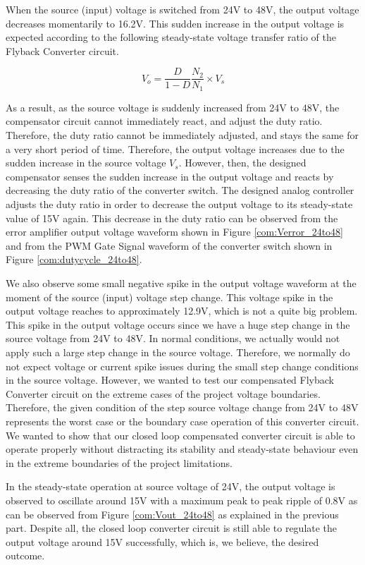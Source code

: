 When the source (input) voltage is switched from 24V to 48V, the output voltage decreases momentarily to 16.2V. This sudden increase in the output voltage is expected according to the following steady-state voltage transfer ratio of the Flyback Converter circuit.

$$ V_o = \frac{D}{1-D}\frac{N_2}{N_1}\times V_s $$

As a result, as the source voltage is suddenly increased from 24V to 48V, the compensator circuit cannot immediately react, and adjust the duty ratio. Therefore, the duty ratio cannot be immediately adjusted, and stays the same for a very short period of time. Therefore, the output voltage increases due to the sudden increase in the source voltage $V_s$. However, then, the designed compensator senses the sudden increase in the output voltage and reacts by decreasing the duty ratio of the converter switch. The designed analog controller adjusts the duty ratio in order to decrease the output voltage to its steady-state value of 15V again. This decrease in the duty ratio can be observed from the error amplifier output voltage waveform shown in Figure \ref{com:Verror_24to48} and from the PWM Gate Signal waveform of the converter switch shown in Figure \ref{com:dutycycle_24to48}.

We also observe some small negative spike in the output voltage waveform at the moment of the source (input) voltage step change. This voltage spike in the output voltage reaches to approximately 12.9V, which is not a quite big problem. This spike in the output voltage occurs since we have a huge step change in the source voltage from 24V to 48V. In normal conditions, we actually would not apply such a large step change in the source voltage. Therefore, we normally do not expect voltage or current spike issues during the small step change conditions in the source voltage. However, we wanted to test our compensated Flyback Converter circuit on the extreme cases of the project voltage boundaries. Therefore, the given condition of the step source voltage change from 24V to 48V represents the worst case or the boundary case operation of this converter circuit. We wanted to show that our closed loop compensated converter circuit is able to operate properly without distracting its stability and steady-state behaviour even in the extreme boundaries of the project limitations.

In the steady-state operation at source voltage of 24V, the output voltage is observed to oscillate around 15V with a maximum peak to peak ripple of 0.8V as can be observed from Figure \ref{com:Vout_24to48} as explained in the previous part. Despite all, the closed loop converter circuit is still able to regulate the output voltage around 15V successfully, which is, we believe, the desired outcome.

